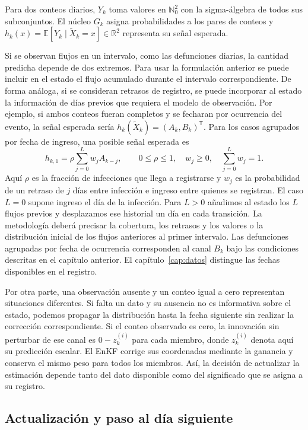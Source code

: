 Para dos conteos diarios, $Y_k$ toma valores en $\mathbb N_0^2$ con la sigma-álgebra de todos sus subconjuntos. El núcleo $G_k$ asigna probabilidades a los pares de conteos y $h_k(x)=\mathbb E[Y_k\mid\widetilde X_k=x]\in\mathbb R^2$ representa su señal esperada.


Si se observan flujos en un intervalo, como las defunciones diarias, la cantidad predicha depende de dos extremos. Para usar la formulación anterior se puede incluir en el estado el flujo acumulado durante el intervalo correspondiente. De forma análoga, si se consideran retrasos de registro, se puede incorporar al estado la información de días previos que requiera el modelo de observación. Por ejemplo, si ambos conteos fueran completos y se fecharan por ocurrencia del evento, la señal esperada sería $h_k(\widetilde X_k)=(A_k,B_k)^{\mathsf T}$. Para los casos agrupados por fecha de ingreso, una posible señal esperada es
\[
 h_{k,1}=\rho\sum_{j=0}^{L}w_j A_{k-j},
 \qquad 0\leq\rho\leq1,\quad w_j\geq0,\quad \sum_{j=0}^{L}w_j=1.
\]
Aquí $\rho$ es la fracción de infecciones que llega a registrarse y $w_j$ es la probabilidad de un retraso de $j$ días entre infección e ingreso entre quienes se registran. El caso $L=0$ supone ingreso el día de la infección. Para $L>0$ añadimos al estado los $L$ flujos previos y desplazamos ese historial un día en cada transición. La metodología deberá precisar la cobertura, los retrasos y los valores o la distribución inicial de los flujos anteriores al primer intervalo. Las defunciones agrupadas por fecha de ocurrencia corresponden al canal $B_k$ bajo las condiciones descritas en el capítulo anterior. El capítulo~\ref{cap:datos} distingue las fechas disponibles en el registro.


Por otra parte, una observación ausente y un conteo igual a cero representan situaciones diferentes. Si falta un dato y su ausencia no es informativa sobre el estado, podemos propagar la distribución hasta la fecha siguiente sin realizar la corrección correspondiente. Si el conteo observado es cero, la innovación sin perturbar de ese canal es $0-z_{k}^{(i)}$ para cada miembro, donde $z_{k}^{(i)}$ denota aquí su predicción escalar. El EnKF corrige sus coordenadas mediante la ganancia y conserva el mismo peso para todos los miembros. Así, la decisión de actualizar la estimación depende tanto del dato disponible como del significado que se asigna a su registro.

\subsection*{Actualización y paso al día siguiente}

